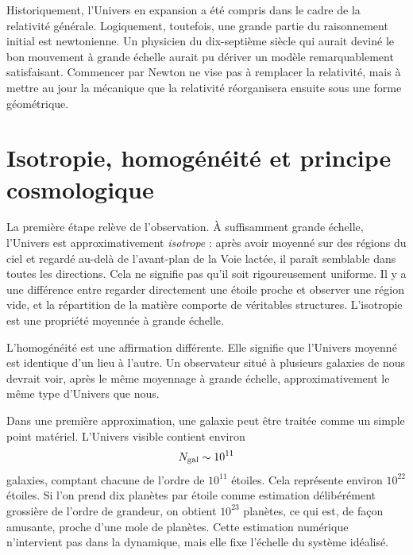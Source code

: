 Historiquement, l’Univers en expansion a été compris dans le cadre de la relativité générale. Logiquement, toutefois, une grande partie du raisonnement initial est newtonienne. Un physicien du dix-septième siècle qui aurait deviné le bon mouvement à grande échelle aurait pu dériver un modèle remarquablement satisfaisant. Commencer par Newton ne vise pas à remplacer la relativité, mais à mettre au jour la mécanique que la relativité réorganisera ensuite sous une forme géométrique.

\section{Isotropie, homogénéité et principe cosmologique}

La première étape relève de l’observation. À suffisamment grande échelle, l’Univers est approximativement \emph{isotrope} : après avoir moyenné sur des régions du ciel et regardé au-delà de l’avant-plan de la Voie lactée, il paraît semblable dans toutes les directions. Cela ne signifie pas qu’il soit rigoureusement uniforme. Il y a une différence entre regarder directement une étoile proche et observer une région vide, et la répartition de la matière comporte de véritables structures. L’isotropie est une propriété moyennée à grande échelle.

L’homogénéité est une affirmation différente. Elle signifie que l’Univers moyenné est identique d’un lieu à l’autre. Un observateur situé à plusieurs galaxies de nous devrait voir, après le même moyennage à grande échelle, approximativement le même type d’Univers que nous.

Dans une première approximation, une galaxie peut être traitée comme un simple point matériel. L’Univers visible contient environ
\begin{equation}
N_{\rm gal}\sim 10^{11}
\end{equation}
galaxies, comptant chacune de l’ordre de \(10^{11}\) étoiles. Cela représente environ \(10^{22}\) étoiles. Si l’on prend dix planètes par étoile comme estimation délibérément grossière de l’ordre de grandeur, on obtient \(10^{23}\) planètes, ce qui est, de façon amusante, proche d’une mole de planètes. Cette estimation numérique n’intervient pas dans la dynamique, mais elle fixe l’échelle du système idéalisé.

\begin{classroomqa}
\end{classroomqa}

